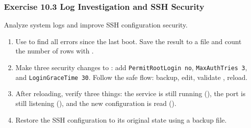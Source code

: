 \subsubsection*{Exercise 10.3 Log Investigation and SSH Security}
Analyze system logs and improve SSH configuration security.
\begin{enumerate}
\item Use  to find all errors since the last boot. Save the result to a file and count the number of rows with .
\item Make three security changes to : add \texttt{PermitRootLogin no}, \texttt{MaxAuthTries 3}, and \texttt{LoginGraceTime 30}. Follow the safe flow: backup, edit, validate , reload.
\item After reloading, verify three things: the service is still running (), the port is still listening (), and the new configuration is read ().
\item Restore the SSH configuration to its original state using a backup file.
\end{enumerate}

